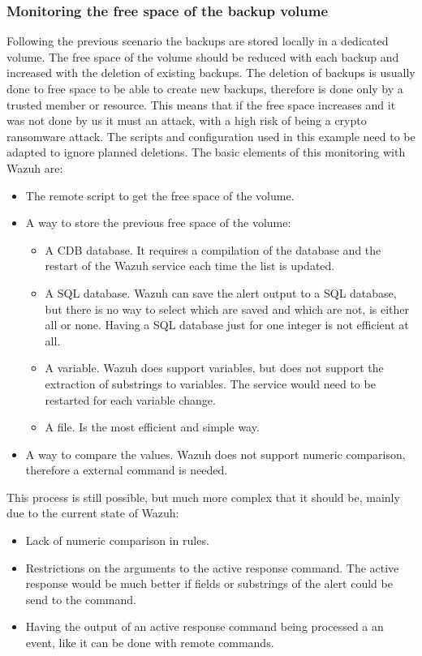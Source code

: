 \subsubsection{Monitoring the free space of the backup volume}
Following the previous scenario the backups are stored locally in a dedicated volume.
The free space of the volume should be reduced with each backup and increased with the deletion of existing backups.
\linej
The deletion of backups is usually done to free space to be able to create new backups, therefore is done only by a trusted member or resource.
This means that if the free space increases and it was not done by us it must an attack, with a high risk of being a crypto ransomware attack.
\linej
The scripts and configuration used in this example need to be adapted to ignore planned deletions.
\linej
\linej
The basic elements of this monitoring with Wazuh are:
\begin{itemize}
	\item The remote script to get the free space of the volume.
	\item A way to store the previous free space of the volume:
	\begin{itemize}
		\item A CDB database. It requires a compilation of the database and the restart of the Wazuh service each time the list is updated.
		\item A SQL database. Wazuh can save the alert output to a SQL database, but there is no way to select which are saved and which are not, is either all or none. Having a SQL database just for one integer is not efficient at all.
		\item A variable. Wazuh does support variables, but does not support the extraction of substrings to variables. The service would need to be restarted for each variable change.
		\item A file. Is the most efficient and simple way.
	\end{itemize}
	\item A way to compare the values. Wazuh does not support numeric comparison, therefore a external command is needed.
\end{itemize}
\linej
This process is still possible, but much more complex that it should be, mainly due to the current state of Wazuh:
\begin{itemize}
	\item Lack of numeric comparison in rules.
	\item Restrictions on the arguments to the active response command. The active response would be much better if fields or substrings of the alert could be send to the command.
	\item Having the output of an active response command being processed a an event, like it can be done with remote commands.
\end{itemize}
